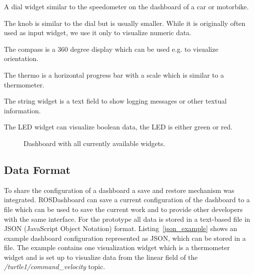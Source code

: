\begin{description}\itemsep4pt \parskip0pt %
\item[Dial] A dial widget similar to the speedometer on the dashboard of a car or motorbike.
\item[Knob] The knob is similar to the dial but is usually smaller. While it is originally often used as input widget, we use it only to visualize numeric data.
\item[Compass] The compass is a 360 degree display which can be used e.g. to visualize orientation.
\item[Thermo] The thermo is a horizontal progress bar with a scale which is similar to a thermometer.
\item[String] The string widget is a text field to show logging messages or other textual information.
\item[LED] The LED widget can visualize boolean data, the LED is either green or red.
\end{description}

\begin{figure}[htb]
  \centering
  \caption{Dashboard with all currently available widgets.}
  \label{all_widgets}
\end{figure}

\subsection{Data Format}
To share the configuration of a dashboard a save and restore mechanism was integrated. ROSDashboard can save a current configuration of the dashboard to a file which can be used to save the current work and to provide other developers with the same interface. For the prototype all data is stored in a text-based file in JSON (JavaScript Object Notation) \cite{JSON} format. Listing~\ref{json_example} shows an example dashboard configuration represented as JSON, which can be stored in a file. The example contains one visualization widget which is a thermometer widget and is set up to visualize data from the linear field of the \emph{/turtle1/command\_velocity} topic.

